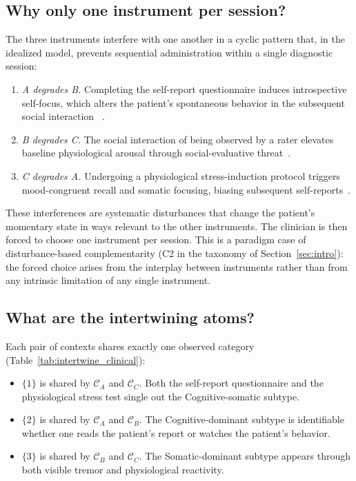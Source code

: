\documentclass{article}
\begin{document}
\subsection{Why only one instrument per session?}

The three instruments interfere with one another in a cyclic pattern
that, in the idealized model, prevents sequential administration
within a single diagnostic session:
\begin{enumerate}
\item \emph{A degrades B.} Completing the self-report questionnaire
induces introspective self-focus, which alters the patient's
spontaneous behavior in the subsequent social interaction
~\cite{Duval1972}.
\item \emph{B degrades C.} The social interaction of being observed
by a rater elevates baseline physiological arousal through
social-evaluative threat~\cite{Dickerson2004}.
\item \emph{C degrades A.} Undergoing a physiological stress-induction
protocol triggers mood-congruent recall and somatic focusing,
biasing subsequent self-reports~\cite{Bower1981}.
\end{enumerate}
These interferences are systematic disturbances that change the
patient's momentary state in ways relevant to the other instruments.
The clinician is then forced to choose one instrument per session.
This is a paradigm case of disturbance-based complementarity (C2 in
the taxonomy of Section~\ref{sec:intro}): the forced choice arises
from the interplay between instruments rather than from any
intrinsic limitation of any single instrument.

\subsection{What are the intertwining atoms?}

Each pair of contexts shares exactly one observed category
(Table~\ref{tab:intertwine_clinical}):
\begin{itemize}
\item $\{1\}$ is shared by $\mathcal{C}_A$ and $\mathcal{C}_C$.
Both the self-report questionnaire and the physiological stress test
single out the Cognitive-somatic subtype.
\item $\{2\}$ is shared by $\mathcal{C}_A$ and $\mathcal{C}_B$.
The Cognitive-dominant subtype is identifiable whether one reads the
patient's report or watches the patient's behavior.
\item $\{3\}$ is shared by $\mathcal{C}_B$ and $\mathcal{C}_C$.
The Somatic-dominant subtype appears through both visible tremor and
physiological reactivity.
\end{itemize}
\end{document}
